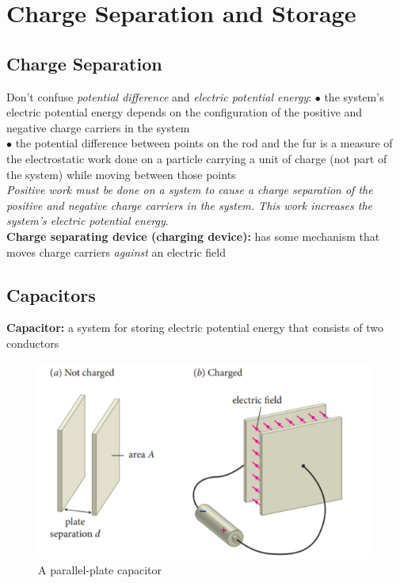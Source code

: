 \section{Charge Separation and Storage}

    \subsection{Charge Separation}  %

        Don't confuse \textit{potential difference} and \textit{electric potential energy}:
        $\bullet$ the system's electric potential energy depends on the configuration of the positive and negative charge carriers in the system \\
        $\bullet$ the potential difference between points on the rod and the fur is a measure of the electrostatic work done on a particle carrying a unit of charge (not part of the system) while moving between those
        points \\

        \textit{Positive work must be done on a system to cause a charge separation of the positive and negative charge carriers in the system. This work increases the system's electric potential energy}. \\

        \textbf{Charge separating device (charging device):} has some mechanism that moves charge carriers \textit{against} an electric field

    \subsection{Capacitors}     %

        \textbf{Capacitor:} a system for storing electric potential energy that consists of two conductors

        \begin{figure}[hbt!]
            \centering
            \caption*{A parallel-plate capacitor}
            \includegraphics[scale = 0.75]{Resources/26.2_Parallel_Plate_Capacitor}
        \end{figure}

